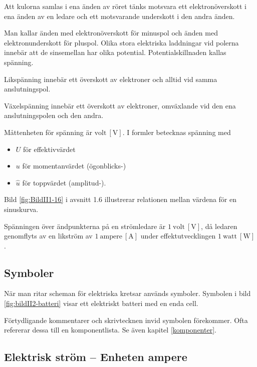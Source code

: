 Att kulorna samlas i ena änden av röret tänks motsvara ett elektronöverskott i
ena änden av en ledare och ett motsvarande underskott i den andra änden.

Man kallar änden med elektronöverskott för minuspol och änden med
elektronunderskott för pluspol.
Olika stora elektriska laddningar vid polerna innebär att de sinsemellan har
olika potential.
Potentialskillnaden kallas spänning.

Likspänning innebär ett överskott av elektroner och alltid vid samma
anslutningspol.

Växelspänning innebär ett överskott av elektroner, omväxlande vid den ena
anslutningspolen och den andra.

Måttenheten för spänning är \(\mathrm{volt\ [V]}\).
I formler betecknas spänning med
\begin{itemize}
  \item \(U\) för effektivvärdet
  \item \(u\) för momentanvärdet (ögonblicks-)
  \item \(\hat{u}\) för toppvärdet (amplitud-).
\end{itemize}
Bild \ref{fig:BildII1-16} i avsnitt 1.6 illustrerar relationen mellan värdena
för en sinuskurva.

Spänningen över ändpunkterna på en strömledare är \(1\ \mathrm{volt\ [V]}\), då
ledaren genomflyts av en likström av \(1\ \mathrm{ampere\ [A]}\) under
effektutvecklingen \(1\ \mathrm{watt\ [W]}\).

\subsection{Symboler}


\frdjp

När man ritar scheman för elektriska kretsar används symboler.
Symbolen i bild \ref{fig:bildII2-batteri} visar ett elektriskt batteri med en
enda cell.

Förtydligande kommentarer och skrivtecknen invid symbolen förekommer.
Ofta refererar dessa till en komponentlista.
Se även kapitel \ref{komponenter}.

\subsection{Elektrisk ström -- Enheten ampere}


